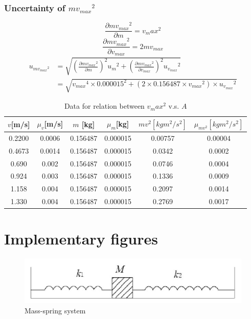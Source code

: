 \documentclass[12pt,a4paper]{article}
\begin{document}
\subsubsection{Uncertainty of $m{v_{max}}^2$}
$$\frac{\partial m{v_{max}}^2}{\partial m}={v_max}^2$$
$$\frac{\partial m{v_{max}}^2}{\partial v_{max}}=2mv_{max}$$
\begin{equation*}
    \begin{split}
        u_{m{v_{max}}^2}&=\sqrt{(\frac{\partial m{v_{max}}^2}{\partial m})^2{u_m}^2+(\frac{\partial m{v_{max}}^2}{\partial v_{max}})^2{u_{v_{max}}}^2}\\
        &=\sqrt{{v_{max}}^4\times 0.000015^2+(2\times 0.156487\times {v_{max}}^2)\times {u_{v_{max}}}^2}
    \end{split}
\end{equation*}

\begin{table}[H]
    \centering
    \begin{tabular}{|c|c|c|c|c|c|}
    \hline
    $v$[m/s]    & $\mu_v$[m/s] & $m$ [kg] & $\mu_m$[kg]  & $mv^2[kgm^2/s^2]$ & $\mu_{mv^2}[kgm^2/s^2]$ \\ \hline
    0.2200 & 0.0006  & 0.156487 & 0.000015 & 0.00757 & 0.00004      \\ \hline
    0.4673 & 0.0014  & 0.156487 & 0.000015 & 0.0342  & 0.0002       \\ \hline
    0.690  & 0.002   & 0.156487 & 0.000015 & 0.0746  & 0.0004       \\ \hline
    0.924  & 0.003   & 0.156487 & 0.000015 & 0.1336  & 0.0009       \\ \hline
    1.158  & 0.004   & 0.156487 & 0.000015 & 0.2097  & 0.0014       \\ \hline
    1.330  & 0.004   & 0.156487 & 0.000015 & 0.2769  & 0.0017       \\ \hline
    \end{tabular}
    \caption{Data for relation between ${v_max}^2$ v.s. $A$}
    \label{v2maxA}
\end{table}

\section{Implementary figures}
\begin{figure}[H]
    \centering
        \includegraphics[width=13cm]{figure1.png}
        \caption{Mass-spring system}
        \label{masssystem}
\end{figure}
\end{document}
